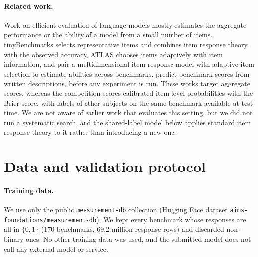 \documentclass{article}
\begin{document}
\paragraph{Related work.} Work on efficient evaluation of language models mostly estimates the aggregate performance or the ability of a model from a small number of items. tinyBenchmarks \citep{polo2024tiny} selects representative items and combines item response theory with the observed accuracy, ATLAS \citep{li2025atlas} chooses items adaptively with item information, and \citet{krumdick2026wild} pair a multidimensional item response model with adaptive item selection to estimate abilities across benchmarks. \citet{park2025anticipatory} predict benchmark scores from written descriptions, before any experiment is run. These works target aggregate scores, whereas the competition scores calibrated item-level probabilities with the Brier score, with labels of other subjects on the same benchmark available at test time. We are not aware of earlier work that evaluates this setting, but we did not run a systematic search, and the shared-label model below applies standard item response theory to it rather than introducing a new one.

\section{Data and validation protocol}
\label{sec:data}
\paragraph{Training data.} We use only the public \texttt{measurement-db} collection (Hugging Face dataset \texttt{aims-foundations/\allowbreak measurement-db}). We kept every benchmark whose responses are all in $\{0,1\}$ (170 benchmarks, 69.2 million response rows) and discarded non-binary ones. No other training data was used, and the submitted model does not call any external model or service.
\end{document}
